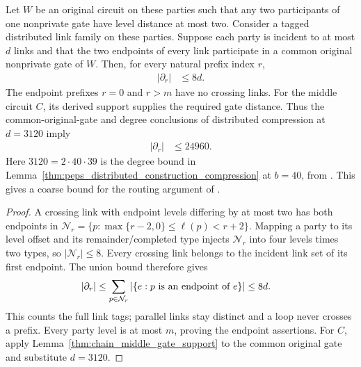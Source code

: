 \begin{lemma}
    \label{thm:chain_tagged_link_congestion}
    \leanok
    Let $W$ be an original circuit on these parties such that any two
    participants of one nonprivate gate have level distance at most two.
    Consider a tagged distributed link family on these parties. Suppose each
    party is incident to at most $d$ links and that the two endpoints
    of every link participate in a common original nonprivate gate of
    $W$. Then, for every natural prefix index $r$,
    \begin{align}
        |\partial_r| & \le8d.
        \label{eq:chain_tagged_link_congestion}
    \end{align}
    The endpoint prefixes $r=0$ and $r>m$ have no crossing links.
    For the middle circuit $C$, its derived support supplies the
    required gate distance. Thus the common-original-gate and
    degree conclusions of distributed compression at $d=3120$ imply
    \begin{align}
        |\partial_r| & \le24960.
        \label{eq:chain_middle_link_congestion}
    \end{align}
    Here $3120=2\cdot40\cdot39$ is the degree bound in
    Lemma~\ref{thm:peps_distributed_construction_compression} at $b=40$,
    from \cite[Theorem~5.2]{OpenAI2026PolynomialPEPS}.
    This gives a coarse bound for the routing argument of
    \cite[Part~II, proof of Theorem~B]{TNLean2026OneDimensional}.
\end{lemma}
\begin{proof}\leanok
    A crossing link with endpoint levels differing by at most two has
    both endpoints in
    $\mathcal N_r=\{p:\max\{r-2,0\}\le\ell(p)<r+2\}$.
    Mapping a party to its level offset and its remainder/completed
    type injects $\mathcal N_r$ into four levels times two types, so
    $|\mathcal N_r|\le8$. Every crossing link belongs to the incident
    link set of its first endpoint. The union bound therefore gives
    \begin{align}
        |\partial_r| & \le\sum_{p\in\mathcal N_r}
        |\{e:p\text{ is an endpoint of }e\}|\le8d.\notag
    \end{align}
    This counts the full link tags; parallel links stay distinct and
    a loop never crosses a prefix. Every party level is at most $m$,
    proving the endpoint assertions. For $C$, apply
    Lemma~\ref{thm:chain_middle_gate_support} to the common original
    gate and substitute $d=3120$.
\end{proof}

